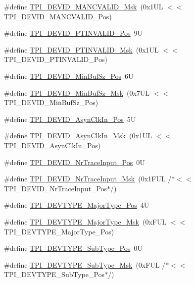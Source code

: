 \begin{DoxyCompactItemize}
\#define \mbox{\hyperlink{group__CMSIS__TPI_ga4c3ee4b1a34ad1960a6b2d6e7e0ff942}{T\+P\+I\+\_\+\+D\+E\+V\+I\+D\+\_\+\+M\+A\+N\+C\+V\+A\+L\+I\+D\+\_\+\+Msk}}~(0x1\+U\+L $<$$<$ T\+P\+I\+\_\+\+D\+E\+V\+I\+D\+\_\+\+M\+A\+N\+C\+V\+A\+L\+I\+D\+\_\+\+Pos)
\item 
\#define \mbox{\hyperlink{group__CMSIS__TPI_ga974cccf4c958b4a45cb71c7b5de39b7b}{T\+P\+I\+\_\+\+D\+E\+V\+I\+D\+\_\+\+P\+T\+I\+N\+V\+A\+L\+I\+D\+\_\+\+Pos}}~9U
\item 
\#define \mbox{\hyperlink{group__CMSIS__TPI_ga1ca84d62243e475836bba02516ba6b97}{T\+P\+I\+\_\+\+D\+E\+V\+I\+D\+\_\+\+P\+T\+I\+N\+V\+A\+L\+I\+D\+\_\+\+Msk}}~(0x1\+U\+L $<$$<$ T\+P\+I\+\_\+\+D\+E\+V\+I\+D\+\_\+\+P\+T\+I\+N\+V\+A\+L\+I\+D\+\_\+\+Pos)
\item 
\#define \mbox{\hyperlink{group__CMSIS__TPI_ga3f7da5de2a34be41a092e5eddd22ac4d}{T\+P\+I\+\_\+\+D\+E\+V\+I\+D\+\_\+\+Min\+Buf\+Sz\+\_\+\+Pos}}~6U
\item 
\#define \mbox{\hyperlink{group__CMSIS__TPI_ga939e068ff3f1a65b35187ab34a342cd8}{T\+P\+I\+\_\+\+D\+E\+V\+I\+D\+\_\+\+Min\+Buf\+Sz\+\_\+\+Msk}}~(0x7\+U\+L $<$$<$ T\+P\+I\+\_\+\+D\+E\+V\+I\+D\+\_\+\+Min\+Buf\+Sz\+\_\+\+Pos)
\item 
\#define \mbox{\hyperlink{group__CMSIS__TPI_gab382b1296b5efd057be606eb8f768df8}{T\+P\+I\+\_\+\+D\+E\+V\+I\+D\+\_\+\+Asyn\+Clk\+In\+\_\+\+Pos}}~5U
\item 
\#define \mbox{\hyperlink{group__CMSIS__TPI_gab67830557d2d10be882284275025a2d3}{T\+P\+I\+\_\+\+D\+E\+V\+I\+D\+\_\+\+Asyn\+Clk\+In\+\_\+\+Msk}}~(0x1\+U\+L $<$$<$ T\+P\+I\+\_\+\+D\+E\+V\+I\+D\+\_\+\+Asyn\+Clk\+In\+\_\+\+Pos)
\item 
\#define \mbox{\hyperlink{group__CMSIS__TPI_ga80ecae7fec479e80e583f545996868ed}{T\+P\+I\+\_\+\+D\+E\+V\+I\+D\+\_\+\+Nr\+Trace\+Input\+\_\+\+Pos}}~0U
\item 
\#define \mbox{\hyperlink{group__CMSIS__TPI_gabed454418d2140043cd65ec899abd97f}{T\+P\+I\+\_\+\+D\+E\+V\+I\+D\+\_\+\+Nr\+Trace\+Input\+\_\+\+Msk}}~(0x1\+F\+U\+L /$\ast$$<$$<$ T\+P\+I\+\_\+\+D\+E\+V\+I\+D\+\_\+\+Nr\+Trace\+Input\+\_\+\+Pos$\ast$/)
\item 
\#define \mbox{\hyperlink{group__CMSIS__TPI_ga69c4892d332755a9f64c1680497cebdd}{T\+P\+I\+\_\+\+D\+E\+V\+T\+Y\+P\+E\+\_\+\+Major\+Type\+\_\+\+Pos}}~4U
\item 
\#define \mbox{\hyperlink{group__CMSIS__TPI_gaecbceed6d08ec586403b37ad47b38c88}{T\+P\+I\+\_\+\+D\+E\+V\+T\+Y\+P\+E\+\_\+\+Major\+Type\+\_\+\+Msk}}~(0x\+F\+U\+L $<$$<$ T\+P\+I\+\_\+\+D\+E\+V\+T\+Y\+P\+E\+\_\+\+Major\+Type\+\_\+\+Pos)
\item 
\#define \mbox{\hyperlink{group__CMSIS__TPI_ga0c799ff892af5eb3162d152abc00af7a}{T\+P\+I\+\_\+\+D\+E\+V\+T\+Y\+P\+E\+\_\+\+Sub\+Type\+\_\+\+Pos}}~0U
\item 
\#define \mbox{\hyperlink{group__CMSIS__TPI_ga5b2fd7dddaf5f64855d9c0696acd65c1}{T\+P\+I\+\_\+\+D\+E\+V\+T\+Y\+P\+E\+\_\+\+Sub\+Type\+\_\+\+Msk}}~(0x\+F\+U\+L /$\ast$$<$$<$ T\+P\+I\+\_\+\+D\+E\+V\+T\+Y\+P\+E\+\_\+\+Sub\+Type\+\_\+\+Pos$\ast$/)
\end{DoxyCompactItemize}


